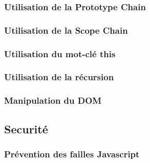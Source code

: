 \documentclass[a4paper]{article}
\begin{document}
		\subsubsection{Utilisation de la Prototype Chain}
		\subsubsection{Utilisation de la Scope Chain}
		\subsubsection{Utilisation du mot-clé this}
		\subsubsection{Utilisation de la récursion}
		\subsubsection{Manipulation du DOM}
   \subsection{Securité} 
  		\subsubsection{Prévention des failles Javascript}
\end{document}

